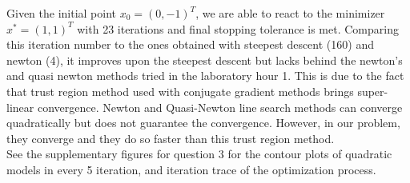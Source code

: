 \documentclass{article}
\begin{document}
Given the initial point $x_0 = (0, -1)^T$, we are able to react to the minimizer $x^* = (1,1)^T$ with 23 iterations and final stopping tolerance is met. Comparing this iteration number to the ones obtained with steepest descent (160) and newton (4), it improves upon the steepest descent but lacks behind the newton's and quasi newton methods tried in the laboratory hour 1. This is due to the fact that trust region method used with conjugate gradient methods brings super-linear convergence. Newton and Quasi-Newton line search methods can converge quadratically but does not guarantee the convergence. However, in our problem, they converge and they do so faster than this trust region method. 
\\ 

See the supplementary figures for question 3 for the contour plots of quadratic models in every 5 iteration, and iteration trace of the optimization process.  
\end{document}

